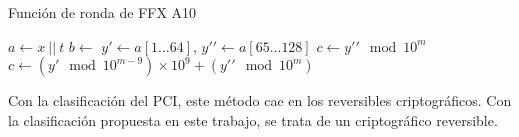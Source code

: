 \begin{algorithm}
  \caption{\label{ffx_ronda} Función de ronda de FFX A10}
  \begin{algorithmic}[1]
      \State $ a \gets x \ || \ t $
      \State $ b \gets $ 
      \State $ y\prime \gets a[1 ... 64] $,
        $ y\prime\prime \gets a[65 ... 128] $
        \State $ c \gets y\prime\prime \mod 10^m $
      \Else
        \State $ c \gets (y\prime \mod 10^{m - 9})
          \times 10^9 + (y\prime\prime \mod 10^m) $
      \EndIf
      \State {}
    \EndFunction
  \end{algorithmic}
\end{algorithm}


Con la clasificación del PCI, este método cae en los reversibles
criptográficos. Con la clasificación propuesta en este trabajo, se trata de un
criptográfico reversible.
